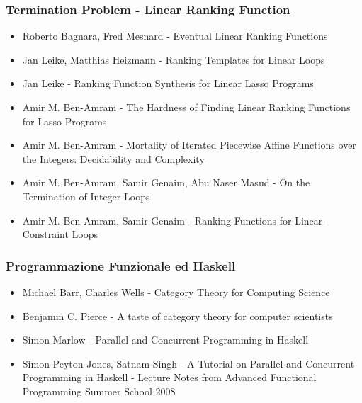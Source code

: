 \subsubsection{Termination Problem - Linear Ranking Function}
\begin{itemize}
	\item Roberto Bagnara, Fred Mesnard - Eventual Linear Ranking Functions 
	\item Jan Leike, Matthias Heizmann - Ranking Templates for Linear Loops
	\item Jan Leike - Ranking Function Synthesis for Linear Lasso Programs
	\item Amir M. Ben-Amram - The Hardness of Finding Linear Ranking Functions for
	Lasso Programs
	\item Amir M. Ben-Amram - Mortality of Iterated Piecewise Affine Functions
	over the Integers:  Decidability and Complexity
	\item Amir M. Ben-Amram, Samir Genaim, Abu Naser Masud - On the Termination of
	Integer Loops
	\item Amir M. Ben-Amram, Samir Genaim - Ranking Functions for
	Linear-Constraint Loops
\end{itemize}

\subsubsection{Programmazione Funzionale ed Haskell}
\begin{itemize}
	\item Michael Barr, Charles Wells - Category Theory for Computing Science
	\item Benjamin C. Pierce - A taste of category theory for computer scientists
	\item Simon Marlow - Parallel and Concurrent Programming in Haskell
	\item Simon Peyton Jones, Satnam Singh - A Tutorial on Parallel and
	Concurrent Programming in Haskell - Lecture Notes from Advanced Functional Programming Summer School 2008
\end{itemize}

